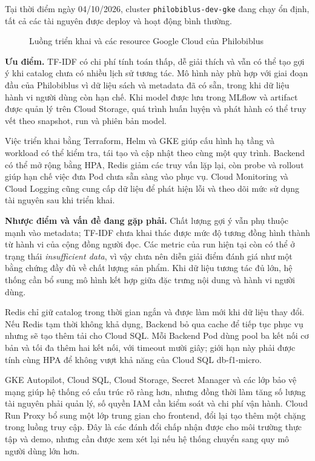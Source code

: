 Tại thời điểm ngày 04/10/2026, cluster \texttt{philobiblus-dev-gke} đang chạy ổn định, tất cả các tài nguyên được deploy và hoạt động bình thường. 

\begin{figure}[H]
\centering

\caption{Luồng triển khai và các resource Google Cloud của Philobiblus}
\label{fig:gcp-architecture}
\end{figure}

\textbf{Ưu điểm.} TF-IDF có chi phí tính toán thấp, dễ giải thích và vẫn có thể tạo gợi ý khi catalog chưa có nhiều lịch sử tương tác. Mô hình này phù hợp với giai đoạn đầu của Philobiblus vì dữ liệu sách và metadata đã có sẵn, trong khi dữ liệu hành vi người dùng còn hạn chế. Khi model được lưu trong MLflow và artifact được quản lý trên Cloud Storage, quá trình huấn luyện và phát hành có thể truy vết theo snapshot, run và phiên bản model.

Việc triển khai bằng Terraform, Helm và GKE giúp cấu hình hạ tầng và workload có thể kiểm tra, tái tạo và cập nhật theo cùng một quy trình. Backend có thể mở rộng bằng HPA, Redis giảm các truy vấn lặp lại, còn probe và rollout giúp hạn chế việc đưa Pod chưa sẵn sàng vào phục vụ. Cloud Monitoring và Cloud Logging cũng cung cấp dữ liệu để phát hiện lỗi và theo dõi mức sử dụng tài nguyên sau khi triển khai.

\textbf{Nhược điểm và vấn đề đang gặp phải.} Chất lượng gợi ý vẫn phụ thuộc mạnh vào metadata; TF-IDF chưa khai thác được mức độ tương đồng hình thành từ hành vi của cộng đồng người đọc. Các metric của run hiện tại còn có thể ở trạng thái \textit{insufficient data}, vì vậy chưa nên diễn giải điểm đánh giá như một bằng chứng đầy đủ về chất lượng sản phẩm. Khi dữ liệu tương tác đủ lớn, hệ thống cần bổ sung mô hình kết hợp giữa đặc trưng nội dung và hành vi người dùng.

Redis chỉ giữ catalog trong thời gian ngắn và được làm mới khi dữ liệu thay đổi. Nếu Redis tạm thời không khả dụng, Backend bỏ qua cache để tiếp tục phục vụ nhưng sẽ tạo thêm tải cho Cloud SQL. Mỗi Backend Pod dùng pool ba kết nối cơ bản và tối đa thêm hai kết nối, với timeout mười giây; giới hạn này phải được tính cùng HPA để không vượt khả năng của Cloud SQL db-f1-micro.

GKE Autopilot, Cloud SQL, Cloud Storage, Secret Manager và các lớp bảo vệ mạng giúp hệ thống có cấu trúc rõ ràng hơn, nhưng đồng thời làm tăng số lượng tài nguyên phải quản lý, số quyền IAM cần kiểm soát và chi phí vận hành. Cloud Run Proxy bổ sung một lớp trung gian cho frontend, đổi lại tạo thêm một chặng trong luồng truy cập. Đây là các đánh đổi chấp nhận được cho môi trường thực tập và demo, nhưng cần được xem xét lại nếu hệ thống chuyển sang quy mô người dùng lớn hơn.
